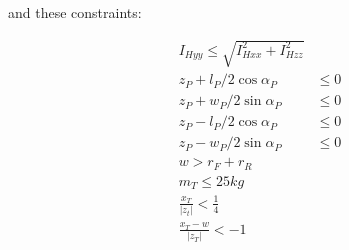 \documentclass{icsc}
\begin{document}
and these constraints:

\begin{align}
  I_{Hyy} \leq \sqrt{I_{Hxx}^2 + I_{Hzz}^2} \\
  z_P + l_P / 2 \cos{\alpha_P} & \leq 0 \\
  z_P + w_P / 2 \sin{\alpha_P} & \leq 0 \\
  z_P - l_P / 2 \cos{\alpha_P} & \leq 0 \\
  z_P - w_P / 2 \sin{\alpha_P} & \leq 0 \\
  w > r_F + r_R \\
  m_T \leq 25 \si{kg} \\
  \frac{x_T}{|z_t|} < \frac{1}{4} \\
  \frac{x_T - w}{|z_T|} < -1
\end{align}
\end{document}
